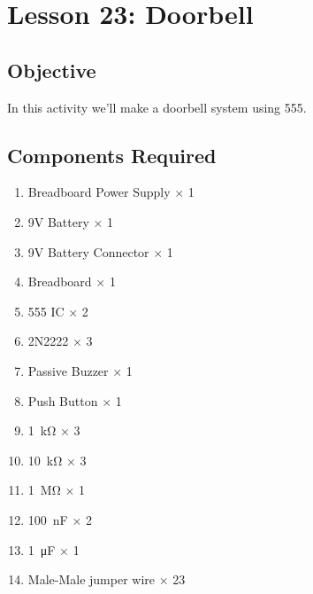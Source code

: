 \section{Lesson 23: Doorbell}
\subsection{Objective}
In this activity we'll make a doorbell system using 555.
\subsection{Components Required}
\begin{enumerate}
    \item Breadboard Power Supply $\times$ 1
    \item 9V Battery $\times$ 1
    \item 9V Battery Connector $\times$ 1
    \item Breadboard $\times$ 1
    \item 555 IC $\times$ 2
    \item 2N2222 $\times$ 3
    \item Passive Buzzer $\times$ 1
    \item Push Button $\times$ 1
    \item \SI{1}{\kilo\ohm} $\times$ 3
    \item \SI{10}{\kilo\ohm} $\times$ 3
    \item \SI{1}{\Mohm} $\times$ 1
    \item \SI{100}{\nano\farad} $\times$ 2
    \item \SI{1}{\micro\farad} $\times$ 1
    \item Male-Male jumper wire $\times$ 23
\end{enumerate}
